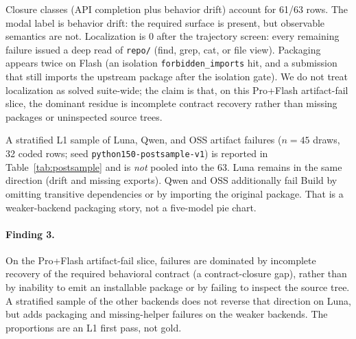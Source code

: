 \begin{table}[t]
  \caption{Primary semantic cause on Pro and Flash artifact failures
  (L1 close-read, $n=63$). Not independent human gold.}
  \label{tab:mechanism}
  \centering
  
\end{table}

Closure classes (API completion plus behavior drift) account for 61/63 rows.
The modal label is behavior drift: the required surface is present, but
observable semantics are not. Localization is 0 after the trajectory screen:
every remaining failure issued a deep read of \texttt{repo/} (find, grep,
cat, or file view). Packaging appears twice on Flash (an isolation
\texttt{forbidden\_imports} hit, and a submission that still imports the
upstream package after the isolation gate). We do not treat localization as
solved suite-wide; the claim is that, on this Pro+Flash artifact-fail slice,
the dominant residue is incomplete contract recovery rather than missing
packages or uninspected source trees.

A stratified L1 sample of Luna, Qwen, and OSS artifact failures
($n=45$ draws, 32 coded rows; seed
\texttt{python150-postsample-v1}) is reported in
Table~\ref{tab:postsample} and is \emph{not} pooled into the 63.
Luna remains in the same direction (drift and missing exports). Qwen and OSS
additionally fail Build by omitting transitive dependencies or by importing
the original package. That is a weaker-backend packaging story, not a
five-model pie chart.

\begin{table}[t]
  \caption{Stratified L1 sample of Luna/Qwen/OSS artifact failures
  (32 coded rows). Not merged with Table~\ref{tab:mechanism}.}
  \label{tab:postsample}
  \centering
  
\end{table}

\paragraph{Finding 3.}
On the Pro+Flash artifact-fail slice, failures are dominated by incomplete
recovery of the required behavioral contract (a contract-closure gap), rather
than by inability to emit an installable package or by failing to inspect the
source tree. A stratified sample of the other backends does not reverse that
direction on Luna, but adds packaging and missing-helper failures on the
weaker backends. The proportions are an L1 first pass, not gold.

